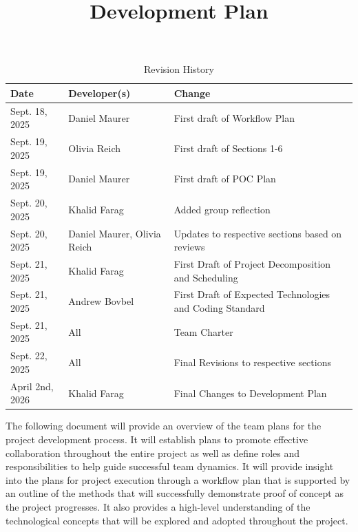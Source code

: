 \documentclass{article}
\title{Development Plan\\\progname}
\author{\authname}
\date{}
\begin{document}
\maketitle

\begin{table}[hp]
\caption{Revision History} \label{TblRevisionHistory}
\begin{tabularx}{\textwidth}{llX}
\toprule
\textbf{Date} & \textbf{Developer(s)} & \textbf{Change}\\
\midrule
Sept. 18, 2025 & Daniel Maurer & First draft of Workflow Plan\\
Sept. 19, 2025 & Olivia Reich & First draft of Sections 1-6\\
Sept. 19, 2025 & Daniel Maurer & First draft of POC Plan\\
Sept. 20, 2025 & Khalid Farag & Added group reflection\\
Sept. 20, 2025 & Daniel Maurer, Olivia Reich & Updates to respective sections based on reviews\\
Sept. 21, 2025 & Khalid Farag & First Draft of Project Decomposition and Scheduling\\
Sept. 21, 2025 & Andrew Bovbel & First Draft of Expected Technologies and Coding Standard\\
Sept. 21, 2025 & All & Team Charter\\
Sept. 22, 2025 & All & Final Revisions to respective sections\\
April 2nd, 2026 & Khalid Farag & Final Changes to Development Plan\\
\bottomrule
\end{tabularx}
\end{table}

\newpage{}

The following document will provide an overview of the team plans for the project development process. It will
establish plans to promote effective collaboration throughout the entire project as well as define roles and
responsibilities to help guide successful team dynamics. It will provide insight into the plans for project
execution through a workflow plan that is supported by an outline of the methods that will successfully demonstrate
proof of concept as the project progresses. It also provides a high-level understanding of the technological
concepts that will be explored and adopted throughout the project.
\end{document}
